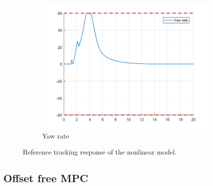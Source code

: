 \documentclass[11pt]{article}
\begin{document}
\begin{enumerate}
\begin{figure}[ht]
\begin{subfigure}[c]{0.3\linewidth}
            \includegraphics[width=\linewidth]{Plots_07_NonlinearModel_ReferenceTracking/09}
            \caption{Yaw rate}
        \end{subfigure}
        \caption{Reference tracking response of the nonlinear model.}
        \label{fig:nonlinear_reference_tracking_with_offset}
    \end{figure}
\end{enumerate}



\subsection*{Offset free MPC} %
\label{sub:offset_free_mpc}
\end{document}

